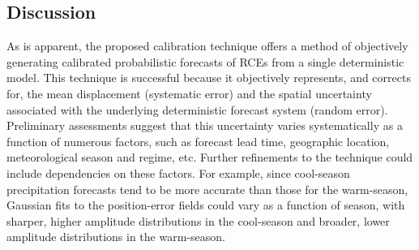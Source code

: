 \subsection{Discussion}
\label{ddiscussion}
As is apparent, the proposed calibration technique offers a method of objectively generating calibrated probabilistic forecasts of RCEs from a single deterministic model.
This technique is successful because it objectively represents, and corrects for, the mean displacement (systematic error) and the spatial uncertainty associated with the underlying deterministic forecast system (random error).
Preliminary assessments suggest that this uncertainty varies systematically as a function of numerous factors, such as forecast lead time, geographic location, meteorological season and regime, etc.
Further refinements to the technique could include dependencies on these factors.
For example, since cool-season precipitation forecasts tend to be more accurate than those for the warm-season, Gaussian fits to the position-error fields could vary as a function of season, with sharper, higher amplitude distributions in the cool-season and broader, lower amplitude distributions in the warm-season.



